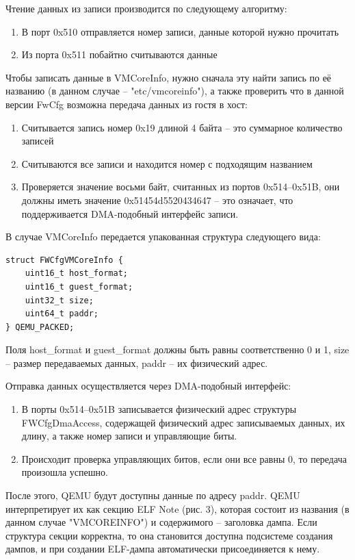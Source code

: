 \documentclass{mipt-thesis-bs}
\begin{document}
Чтение данных из записи производится по следующему алгоритму:
\begin{enumerate}
\item В порт 0x510 отправляется номер записи, данные которой нужно прочитать
\item Из порта 0x511 побайтно считываются данные
\end{enumerate}

Чтобы записать данные в VMCoreInfo, нужно сначала эту найти запись по её названию (в данном случае -- "etc/vmcoreinfo"), а также проверить что в данной версии FwCfg возможна передача данных из гостя в хост:

\begin{enumerate}
\item Считывается запись номер 0x19 длиной 4 байта -- это суммарное количество записей
\item Считываются все записи и находится номер с подходящим названием
\item Проверяется значение восьми байт, считанных из портов 0x514--0x51B, они должны иметь значение 0x51454d5520434647 -- это означает, что поддерживается DMA-подобный интерфейс записи.
\end{enumerate}

В случае VMCoreInfo передается упакованная структура следующего вида:

\begin{verbatim}
struct FWCfgVMCoreInfo {
    uint16_t host_format;
    uint16_t guest_format;
    uint32_t size;
    uint64_t paddr;
} QEMU_PACKED;
\end{verbatim}

Поля host{\_}format и guest{\_}format должны быть равны соответственно 0 и 1, size -- размер передаваемых данных, paddr -- их физический адрес. 

Отправка данных осуществляется через DMA-подобный интерфейс:

\begin{enumerate}
\item В порты 0x514--0x51B записывается физический адрес структуры FWCfgDmaAccess, содержащей физический адрес записываемых данных, их длину, а также номер записи и управляющие биты.
\item Происходит проверка управляющих битов, если они все равны 0, то передача произошла успешно.
\end{enumerate}

После этого, QEMU будут доступны данные по адресу paddr. QEMU интерпретирует их как секцию ELF Note (рис. 3), которая состоит из названия (в данном случае "VMCOREINFO") и содержимого -- заголовка дампа\cite{elfspec}. Если структура секции корректна, то она становится доступна подсистеме создания дампов, и при создании ELF-дампа автоматически присоединяется к нему.
\end{document}
